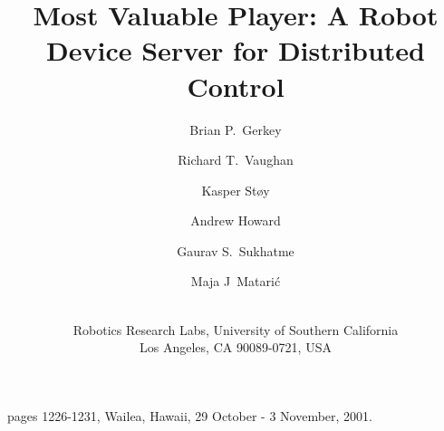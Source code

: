        {pages 1226-1231, Wailea, Hawaii, 29 October - 3 November, 2001.}


\newcommand{\xsection}[1]{
  \vspace*{-2em}
  \section{#1}
  \vspace*{-1em}
}
\newcommand{\xsubsection}[1]{
  \subsection{#1}
  \vspace*{-1em}
}



\date{}
\title{Most Valuable Player: A Robot Device Server for
  Distributed Control}

\author{Brian P.~Gerkey  \and
  Richard T.~Vaughan \and Kasper St{\o}y \and Andrew Howard \and
  Gaurav S.~Sukhatme \and Maja J~Matari\'{c} \and \\
  Robotics Research Labs, University of Southern California\\
  Los Angeles, CA 90089-0721, USA}



\maketitle
\pagestyle{empty}
\thispagestyle{empty}

